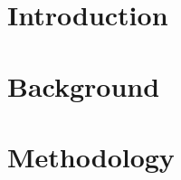 

\raggedbottom %


\frontmatter	 %


\newpage
%

\tableofcontents*												%

\mainmatter
%


\chapter{Introduction}


\chapter{Background} 




\chapter{Methodology}





%

